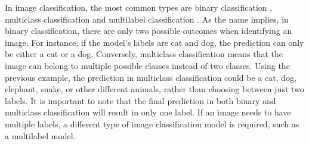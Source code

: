 \begin{ZhChapter}
    In image classification, the most common types are binary classification \cite{zhuang2019structured}, multiclass classification \cite{murthy2016deep} and multilabel classification \cite{tsoumakas2008multi}. As the name implies, in binary classification, there are only two possible outcomes when identifying an image. For instance, if the model's labels are cat and dog, the prediction can only be either a cat or a dog. Conversely, multiclass classification means that the image can belong to multiple possible classes instead of two classes. Using the previous example, the prediction in multiclass classification could be a cat, dog, elephant, snake, or other different animals, rather than choosing between just two labels. It is important to note that the final prediction in both binary and multiclass classification will result in only one label. If an image needs to have multiple labels, a different type of image classification model is required, such as a multilabel model.


\end{ZhChapter}
